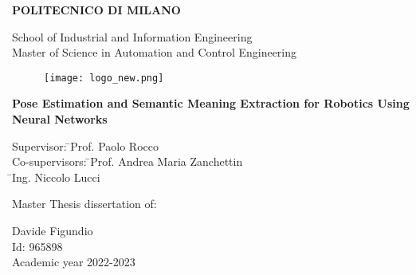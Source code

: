 \begin{titlepage} %
    \begin{center} %
    \LARGE \textbf{POLITECNICO DI MILANO}\\
    \vspace{0.1cm} %
    
    
    \large School of Industrial and Information Engineering\\Master of Science in Automation and Control Engineering
    \vspace{1cm}
    
    \begin{figure}[!h]\centering\texttt{[image: logo\_new.png]}\end{figure}
    \vspace{.8cm}
    
    {\LARGE \textbf{Pose Estimation and Semantic Meaning Extraction for Robotics Using Neural Networks}} %
    
    \end{center} %
    \vspace{1.2cm}
    
    \begin{flushleft}
        \begin{tabbing}
            \large{Supervisor: \hspace{1.25cm}}\=\large{Prof. Paolo Rocco}\\
            \large{Co-supervisors: \hspace{0.3cm}}\=\large{Prof. Andrea Maria Zanchettin}\\
            \large{\hspace{4cm}}\=\large{Ing. Niccolo Lucci}\\
        \end{tabbing}
    \end{flushleft}
    
    \vspace{0.5cm}
    
    \large \begin{flushright} %
        Master Thesis dissertation of:
    \end{flushright}
    \vspace{-0.9cm}
    \large
    \begin{flushright} 
        Davide Figundio\\
        Id: 965898\\
        Academic year 2022-2023
    \end{flushright}
    
\end{titlepage} %